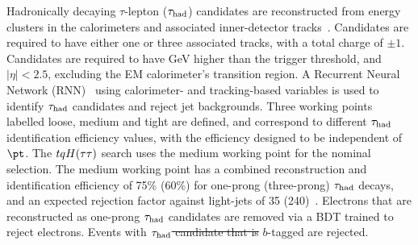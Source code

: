 \documentclass[PAPER, coverpage, atlasdraft=true, texlive=2016, UKenglish]{\ATLASLATEXPATH atlasdoc}
\providecommand{\DIFadd}[1]{{\protect\color{blue}\uwave{#1}}} %
\providecommand{\DIFdel}[1]{{\protect\color{red}\sout{#1}}}                      %
\providecommand{\DIFaddbegin}{} %
\providecommand{\DIFaddend}{} %
\providecommand{\DIFdelbegin}{} %
\providecommand{\DIFdelend}{} %
\begin{document}
Hadronically decaying $\tau$-lepton ($\had$) candidates are reconstructed from energy clusters in the calorimeters and
associated inner-detector tracks~\cite{ATL-PHYS-PUB-2019-033}. %
Candidates are required to have either one or three associated tracks,
with a total charge of $\pm 1$. Candidates are required to have  GeV higher than the trigger threshold, and $|\eta|<2.5$,
excluding the EM calorimeter's transition region.
A Recurrent Neural Network (RNN)~\cite{Graves:2012SCI}
using calorimeter- and tracking-based variables is used to identify $\had$ candidates and reject jet backgrounds.
Three working points labelled loose, medium and tight are defined, and correspond to different $\had$ identification efficiency values, with the efficiency designed to be independent of $\pt$. The $tqH(\tau\tau)$ search uses the medium
working point for the nominal selection.
The medium working point has a combined reconstruction and identification efficiency of 75\% (60\%) for one-prong (three-prong) $\had$ 
decays, and an expected rejection factor against light-jets of 35 (240)~\cite{ATL-PHYS-PUB-2019-033}. 
Electrons that are reconstructed as one-prong $\had$ candidates are removed via a BDT trained to reject electrons.
Events with \DIFdelbegin \DIFdel{$\had$ candidate that is }\DIFdelend \DIFaddbegin \DIFadd{a }\DIFaddend $b$-tagged \DIFaddbegin \DIFadd{$\had$ candidate }\DIFaddend are rejected.
\end{document}
